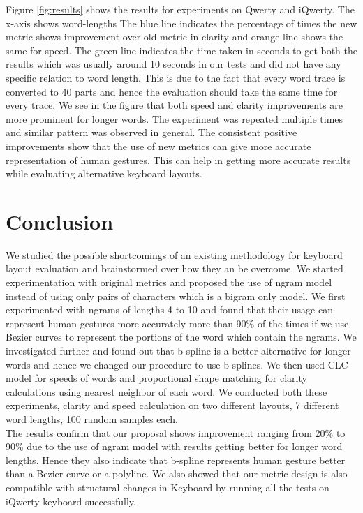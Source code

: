 \documentclass[MTech]{iitmdiss}
\begin{document}
Figure \ref{fig:results} shows the results for experiments on Qwerty and iQwerty. The x-axis shows word-lengths The blue line indicates the percentage of times the new metric shows improvement over old metric in clarity and orange line shows the same for speed. The green line indicates the time taken in seconds to get both the results which was usually around 10 seconds in our tests and did not have any specific relation to word length. This is due to the fact that every word trace is converted to 40 parts and hence the evaluation should take the same time for every trace.  We see in the figure that both speed and clarity improvements are more prominent for longer words. The experiment was repeated multiple times and similar pattern was observed in general. The consistent positive improvements show that the use of new metrics can give more accurate representation of human gestures. This can help in getting more accurate results while evaluating alternative keyboard layouts.

\chapter{Conclusion}
We studied the possible shortcomings of an existing methodology for keyboard layout evaluation and brainstormed over how they an be overcome. We started experimentation with original metrics and proposed the use of ngram model instead of using only pairs of characters which is a bigram only model. We first experimented with ngrams of lengths 4 to 10 and found that their usage can represent human gestures more accurately more than 90\% of the times if we use Bezier curves to represent the portions of the word which contain the ngrams. We investigated further and found out that b-spline is a better alternative for longer words and hence we changed our procedure to use b-splines. We then used CLC model for speeds of words and proportional shape matching for clarity calculations using nearest neighbor of each word. We conducted both these experiments, clarity and speed calculation on two different layouts, 7 different word lengths, 100 random samples each.\\
The results confirm that our proposal shows improvement ranging from 20\% to 90\% due to the use of ngram model with results getting better for longer word lengths. Hence they also indicate that b-spline represents human gesture better than a Bezier curve or a polyline. We also showed that our metric design is also compatible with structural changes in Keyboard by running all the tests on iQwerty keyboard successfully.
\end{document}
